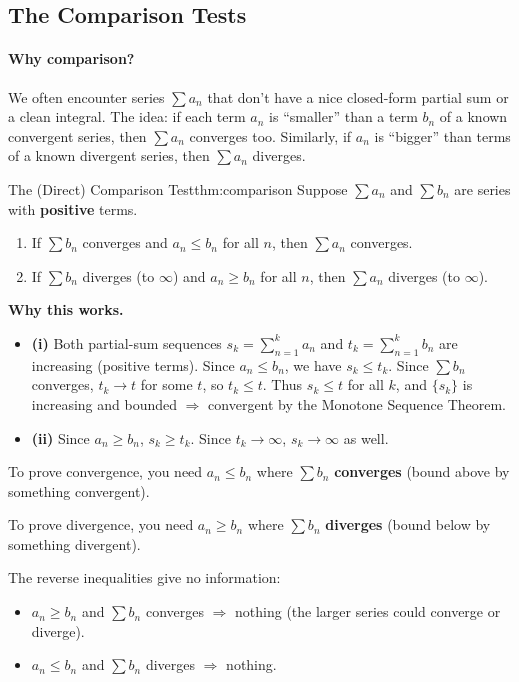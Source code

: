 \subsection{The Comparison Tests}

\paragraph{Why comparison?}
We often encounter series $\sum a_n$ that don't have a nice closed-form partial sum or a clean integral.
The idea: if each term $a_n$ is ``smaller'' than a term $b_n$ of a known convergent series, then $\sum a_n$ converges too.
Similarly, if $a_n$ is ``bigger'' than terms of a known divergent series, then $\sum a_n$ diverges.

\begin{theorem}{The (Direct) Comparison Test}{thm:comparison}
Suppose $\sum a_n$ and $\sum b_n$ are series with \textbf{positive} terms.
\begin{enumerate}[label=(\roman*), leftmargin=3em]
\item If $\sum b_n$ converges and $a_n\le b_n$ for all $n$, then $\sum a_n$ converges.
\item If $\sum b_n$ diverges (to $\infty$) and $a_n\ge b_n$ for all $n$, then $\sum a_n$ diverges (to $\infty$).
\end{enumerate}
\end{theorem}

\noindent
\textbf{Why this works.}
\begin{itemize}[leftmargin=*]
\item \textbf{(i)} Both partial-sum sequences $s_k=\sum_{n=1}^k a_n$ and $t_k=\sum_{n=1}^k b_n$ are increasing (positive terms). Since $a_n\le b_n$, we have $s_k\le t_k$. Since $\sum b_n$ converges, $t_k\to t$ for some $t$, so $t_k\le t$. Thus $s_k\le t$ for all $k$, and $\{s_k\}$ is increasing and bounded $\Rightarrow$ convergent by the Monotone Sequence Theorem.
\item \textbf{(ii)} Since $a_n\ge b_n$, $s_k\ge t_k$. Since $t_k\to\infty$, $s_k\to\infty$ as well.
\end{itemize}

\begin{commonmistake}[title={Common Mistake: Wrong direction of comparison}]
To prove convergence, you need $a_n\le b_n$ where $\sum b_n$ \textbf{converges} (bound above by something convergent).

To prove divergence, you need $a_n\ge b_n$ where $\sum b_n$ \textbf{diverges} (bound below by something divergent).

The reverse inequalities give no information:
\begin{itemize}[leftmargin=*]
\item $a_n\ge b_n$ and $\sum b_n$ converges $\Rightarrow$ nothing (the larger series could converge or diverge).
\item $a_n\le b_n$ and $\sum b_n$ diverges $\Rightarrow$ nothing.
\end{itemize}
\end{commonmistake}

